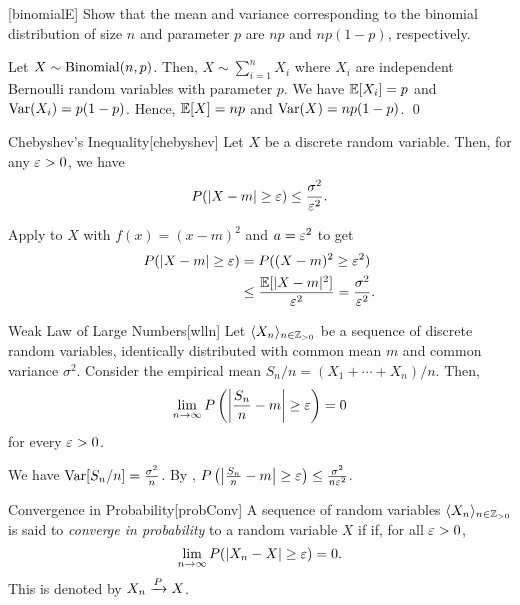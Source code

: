 \documentclass[../probability.tex]{subfiles}
\begin{document}
\begin{Exercise}{}[binomialE]
    Show that the mean and variance corresponding to the binomial distribution
    of size \(n\) and parameter \(p\) are \(np\) and \(np(1-p)\), respectively.
\end{Exercise}
\begin{solution}
    Let \(X \sim \operatorname{Binomial}(n, p)\).
    Then, \(X \sim \sum_{i=1}^n X_i\)
    where \(X_i\) are independent Bernoulli random variables with parameter \(p\).
    We have \(\mathbb{E}[X_i] = p\) and \(\operatorname{Var}(X_i) = p(1-p)\).
    Hence, \(\mathbb{E}[X] = np\) and \(\operatorname{Var}(X) = np(1-p)\).
    \qed
\end{solution}

\begin{Theorem}{Chebyshev's Inequality}[chebyshev]
    Let \(X\) be a discrete random variable. Then,
    for any \(\varepsilon > 0\), we have
    \[
        P(|X-m| \ge \varepsilon) \le \frac{\sigma^2}{\varepsilon^2}\text.
    \]
\end{Theorem}
\begin{myproof}[Proof]
    Apply  to \(X\) with \(f(x) = (x-m)^2\) and \(a = \varepsilon^2\) to get
    \begin{align*}
        P(|X-m| \ge \varepsilon)
        &= P((X-m)^2 \ge \varepsilon^2) \\
        &\le \frac{\mathbb{E}[|X-m|^2]}{\varepsilon^2}
        = \frac{\sigma^2}{\varepsilon^2}\text. \qedhere
    \end{align*}
\end{myproof}

\begin{Theorem}{Weak Law of Large Numbers}[wlln]
    Let \(\lang X_n \rang_{n \in \ZZ_{>0}}\) be a sequence of discrete random variables,
    identically distributed with common mean \(m\) and common variance \(\sigma^2\).
    Consider the empirical mean \(S_n/n = (X_1 + \cdots + X_n)/n\).
    Then,
    \[
        \lim_{n \to \infty} P \left( \left| \frac{S_n}{n}-m \right| \ge \varepsilon \right) = 0
    \]
    for every \(\varepsilon > 0\).
\end{Theorem}
\begin{myproof}[Proof]
    We have \(\operatorname{Var}[S_n/n] = \frac{\sigma^2}{n}\).
    By ,
    \(P \left( \left| \frac{S_n}{n}-m \right| \ge \varepsilon \right) \le \frac{\sigma^2}{n\varepsilon^2}\).
\end{myproof}

\begin{Definition}{Convergence in Probability}[probConv]
    A sequence of random variables \(\lang X_n \rang_{n \in \ZZ_{>0}}\) is said to
    \emph{converge in probability} to a random variable \(X\) if
    if, for all \(\varepsilon > 0\),
    \[
        \lim_{n \to \infty} P(|X_n - X| \ge \varepsilon) = 0\text.
    \]
    This is denoted by \(X_n \xrightarrow{P} X\).
\end{Definition}

\end{document}
